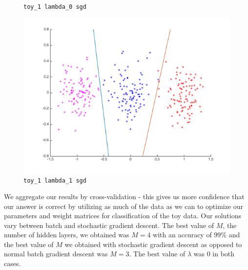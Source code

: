 \documentclass[11pt,letterpaper]{article}
\begin{document}
\begin{figure}[!htb]
  \caption{\texttt{toy\_1 lambda\_0 sgd}}\label{fig:gradDifSs}
\endminipage\hfill
{}
  \includegraphics[width=\linewidth]{figures/sgd_lambda1_toy.png}
  \caption{\texttt{toy\_1 lambda\_1 sgd}}\label{fig:gradDifS}
\endminipage
\end{figure}

We aggregate our results by cross-validation - this gives us more confidence that our answer is correct by utilizing as much of the data as we can to optimize our parameters and weight matrices for classification of the toy data. Our solutions vary between batch and stochastic gradient descent. The best value of $M$, the number of hidden layers, we obtained was $M=4$ with an accuracy of $99\%$ and the best value of $M$ we obtained with stochastic gradient descent as opposed to normal batch gradient descent was $M=3$. The best value of $\lambda$ was 0 in both cases.\\
\end{document}
